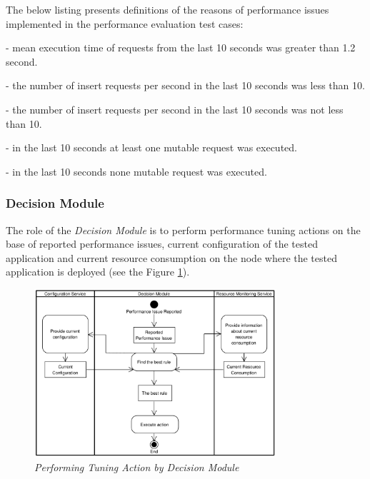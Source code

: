 \documentclass[12pt,a4paper]{article}
\let\tempone\itemize
\let\temptwo\enditemize
\renewenvironment{itemize}{\tempone\addtolength{\itemsep}{-0.4\baselineskip}}{\temptwo}
\begin{document}
The below listing presents definitions of the reasons of performance issues implemented in the performance evaluation test cases:
\begin{itemize}
\item[EXCEEDED (executionTime)] - mean execution time of requests from the last 10 seconds was greater than 1.2 second. 
\item[LOW (insertsLevel)] - the number of insert requests per second in the last 10 seconds was  less than 10. 
\item[HIGH (insertsLevel)] - the number of insert requests per second in the last 10 seconds was not less than 10.
\item[MUTABLE (trafficProfile)] - in the last 10 seconds at least one mutable request was executed.
\item[IMMUTABLE (trafficProfile)] - in the last 10 seconds none mutable request was executed.
\end{itemize}

\subsubsection{Decision Module} \label{dm}

The role of the \textit{Decision Module} is to perform performance tuning actions on the base of reported performance issues, current configuration of the tested application and current resource consumption on the node where the tested application is deployed (see the Figure \ref{decisionmodule}). 

\begin{figure}[!htb]
\centering
\includegraphics[width=0.8\textwidth]{APTSFlow}
\caption{\textit{Performing Tuning Action by Decision Module}} \label{decisionmodule}
\end{figure}
\end{document}
